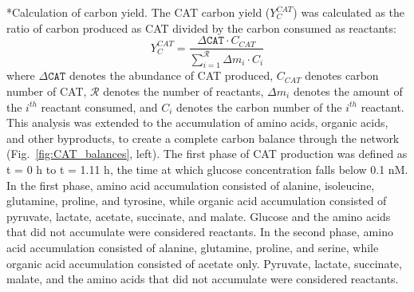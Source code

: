 \documentclass[12pt]{article}
\makeatletter
\renewcommand\subsection{\@startsection
	{subsection}{2}{0mm}
	{-0.05in}
	{-0.5\baselineskip}
	{\normalfont\normalsize\bfseries}}
\makeatother
\begin{document}
\subsection*{Calculation of carbon yield.}
The CAT carbon yield ($Y_{C}^{CAT}$) was calculated as the ratio of carbon produced as CAT divided by the carbon consumed as reactants:
\begin{equation}\label{eqn:yield-definition}
	Y_{C}^{CAT}=\frac{\Delta\texttt{CAT}\cdot C_{CAT}}{\displaystyle\sum_{i=1}^{\mathcal{R}}\Delta m_{i}\cdot C_i}
\end{equation}
where $\Delta\texttt{CAT}$ denotes the abundance of CAT produced, $C_{CAT}$ denotes carbon number of CAT, $\mathcal{R}$ denotes the number of reactants, $\Delta m_{i}$ denotes the amount of the $i^{th}$ reactant consumed, and $C_i$ denotes the carbon number of the $i^{th}$ reactant.
This analysis was extended to the accumulation of amino acids, organic acids, and other byproducts, to create a complete carbon balance through the network (Fig.~\ref{fig:CAT_balances}, left).
The first phase of CAT production was defined as t = 0 h to t = 1.11 h, the time at which glucose concentration falls below 0.1 nM.
In the first phase, amino acid accumulation consisted of alanine, isoleucine, glutamine, proline, and tyrosine, while organic acid accumulation consisted of pyruvate, lactate, acetate, succinate, and malate.
Glucose and the amino acids that did not accumulate were considered reactants.
In the second phase, amino acid accumulation consisted of alanine, glutamine, proline, and serine, while organic acid accumulation consisted of acetate only.
Pyruvate, lactate, succinate, malate, and the amino acids that did not accumulate were considered reactants.
\end{document}
